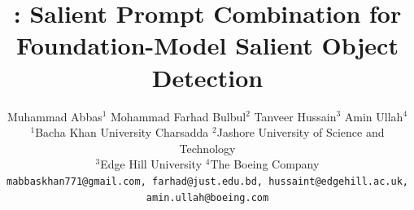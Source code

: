 \documentclass[10pt,twocolumn,letterpaper]{article}
\title{\methodname: Salient Prompt Combination for Foundation-Model Salient Object Detection}
\author{
Muhammad Abbas$^{1}$\quad
Mohammad Farhad Bulbul$^{2}$\quad
Tanveer Hussain$^{3}$\quad
Amin Ullah$^{4}$\\[4pt]
$^{1}$Bacha Khan University Charsadda\quad
$^{2}$Jashore University of Science and Technology\\
$^{3}$Edge Hill University\quad
$^{4}$The Boeing Company\\[2pt]
{\tt\small mabbaskhan771@gmail.com, farhad@just.edu.bd, hussaint@edgehill.ac.uk, amin.ullah@boeing.com}
}
\begin{document}
\maketitle






{
    \small
    
    
}
\end{document}
